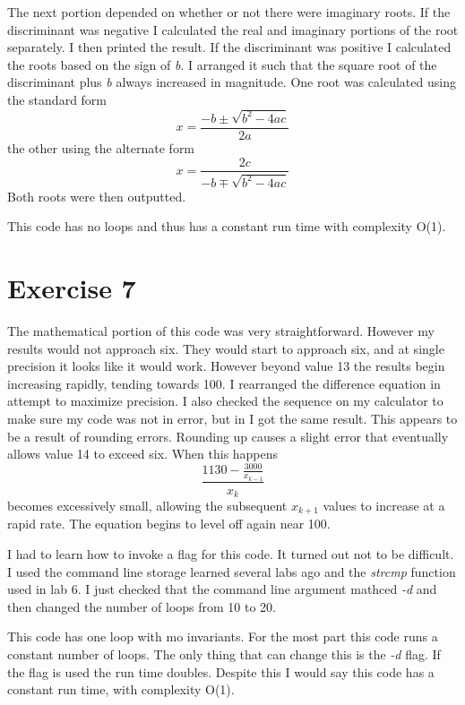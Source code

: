 \documentclass{article}
\begin{document}
The next portion depended on whether or not there were imaginary roots. If the discriminant was negative I calculated the real and imaginary portions of the root separately. I then printed the result. If the discriminant was positive I calculated the roots based on the sign of \textit{b}. I arranged it such that the square root of the discriminant plus \textit{b} always increased in magnitude. One root was calculated using the standard form
\begin{equation}
    x=\frac{-b \pm \sqrt{b^2-4ac}}{2a}
\end{equation}
the other using the alternate form
\begin{equation}
    x=\frac{2c}{-b \mp \sqrt{b^2-4ac}}
\end{equation}
Both roots were then outputted.

This code has no loops and thus has a constant run time with complexity O(1).

\section{Exercise 7}
The mathematical portion of this code was very straightforward. However my results would not approach six. They would start to approach six, and at single precision it looks like it would work. However beyond value 13 the results begin increasing rapidly, tending towards 100. I rearranged the difference equation in attempt to maximize precision. I also checked the sequence on my calculator to make sure my code was not in error, but in I got the same result. This appears to be a result of rounding errors. Rounding up causes a slight error that eventually allows value 14 to exceed six. When this happens
\begin{equation}
    \frac{1130-\frac{3000}{x_{k-1}}}{x_k}
\end{equation}
becomes excessively small, allowing the subsequent $x_{k+1}$ values to increase at a rapid rate. The equation begins to level off again near 100.

I had to learn how to invoke a flag for this code. It turned out not to be difficult. I used the command line storage learned several labs ago and the \textit{strcmp} function used in lab 6. I just checked that the command line argument mathced \textit{-d} and then changed the number of loops from 10 to 20.

This code has one loop with mo invariants. For the most part this code runs a constant number of loops. The only thing that can change this is the \textit{-d} flag. If the flag is used the run time doubles. Despite this I would say this code has a constant run time, with complexity O(1).
\end{document}
